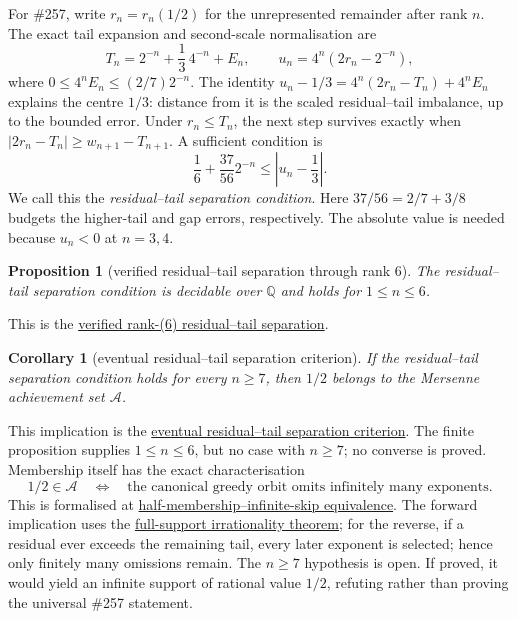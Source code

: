 \documentclass[11pt]{article}
\newcommand{\commit}{ebc98ee71f6819bd9fe344a0bb343542c604e533}
\newcommand{\repobase}{https://github.com/wcook04/plectis-lean-erdos249-257/blob/\commit}
\newcommand{\PK}{Erdos249257}
\newcommand{\lword}[4]{\href{\repobase/\PK/#1\#L#2}{#4}}
\newtheorem{proposition}[theorem]{Proposition}
\newtheorem{corollary}[theorem]{Corollary}
\theoremstyle{definition}
\theoremstyle{remark}
\newcommand{\Q}{\mathbb{Q}}
\begin{document}
For \#257, write \(r_n=r_n(1/2)\) for the unrepresented remainder after rank
\(n\).  The exact tail expansion and second-scale normalisation are
\[
 T_n=2^{-n}+\frac13\,4^{-n}+E_n,
 \qquad u_n=4^n(2r_n-2^{-n}),
\]
where \(0\le4^nE_n\le(2/7)2^{-n}\).  The identity
\(u_n-1/3=4^n(2r_n-T_n)+4^nE_n\) explains the centre \(1/3\): distance from it
is the scaled residual--tail imbalance, up to the bounded error.  Under
\(r_n\le T_n\), the next step survives exactly when
\(\lvert2r_n-T_n\rvert\ge w_{n+1}-T_{n+1}\).  A sufficient condition is
\[
  \frac16+\frac{37}{56}2^{-n}\le \left|u_n-\frac13\right|.
\]
We call this the \emph{residual--tail separation condition}.  Here
\(37/56=2/7+3/8\) budgets the higher-tail and gap errors, respectively.
The absolute value is needed because \(u_n<0\) at \(n=3,4\).

\begin{proposition}[verified residual--tail separation through rank \(6\)]\label{res:secondfrontier}
The residual--tail separation condition is decidable over $\Q$ and holds for
$1\le n\le6$.
\end{proposition}
\noindent This is the
\lword{GreedyAchievementSet.lean}{2723}{halfSecondChannelSeparatedRat_of_pos_le_six}{verified rank-(6) residual--tail separation}.

\begin{corollary}[eventual residual--tail separation criterion]
\label{res:secondcriterion}
If the residual--tail separation condition holds for every \(n\ge7\), then
\(1/2\) belongs to the Mersenne achievement set \(\mathcal A\).
\end{corollary}
\noindent This implication is the
\lword{GreedyAchievementSet.lean}{2901}{half_mem_mersenneAchievementSet_of_secondChannelSeparationRat_from_seven}{eventual residual--tail separation criterion}.
The finite proposition supplies \(1\le n\le6\), but no case with \(n\ge7\);
no converse is proved.  Membership itself has the exact characterisation
\[
  1/2\in\mathcal A
  \quad\Longleftrightarrow\quad
  \text{the canonical greedy orbit omits infinitely many exponents}.
\]
This is formalised at
\lword{GreedyAchievementSet.lean}{2514}{half_mem_mersenneAchievementSet_iff_greedySkippedSupport_infinite}{half-membership--infinite-skip equivalence}.
The forward implication uses the
\hyperref[res:full]{full-support irrationality theorem}; for the reverse,
if a residual ever exceeds the remaining tail, every later exponent is
selected; hence only finitely many omissions remain.  The \(n\ge7\) hypothesis
is open.  If proved, it would yield an infinite support of rational value
\(1/2\), refuting rather than proving the universal \#257 statement.
\end{document}

